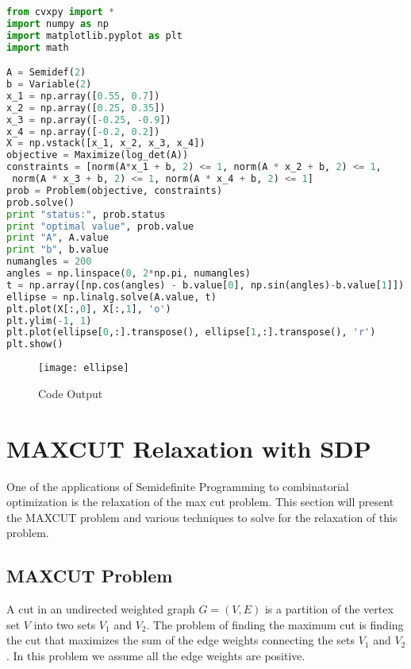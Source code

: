 \documentclass{article}
\begin{document}
\clearpage
\begin{lstlisting}[language=Python, caption=Solving Minimum Volume Ellipsoid Covering A Finite Set with CVXPY in Python]
from cvxpy import *
import numpy as np
import matplotlib.pyplot as plt
import math

A = Semidef(2)
b = Variable(2)
x_1 = np.array([0.55, 0.7])
x_2 = np.array([0.25, 0.35])
x_3 = np.array([-0.25, -0.9])
x_4 = np.array([-0.2, 0.2])
X = np.vstack([x_1, x_2, x_3, x_4])
objective = Maximize(log_det(A))
constraints = [norm(A*x_1 + b, 2) <= 1, norm(A * x_2 + b, 2) <= 1,
 norm(A * x_3 + b, 2) <= 1, norm(A * x_4 + b, 2) <= 1]
prob = Problem(objective, constraints)
prob.solve()
print "status:", prob.status
print "optimal value", prob.value
print "A", A.value
print "b", b.value
numangles = 200
angles = np.linspace(0, 2*np.pi, numangles)
t = np.array([np.cos(angles) - b.value[0], np.sin(angles)-b.value[1]]).reshape(2,200)
ellipse = np.linalg.solve(A.value, t)
plt.plot(X[:,0], X[:,1], 'o')
plt.ylim(-1, 1)
plt.plot(ellipse[0,:].transpose(), ellipse[1,:].transpose(), 'r')
plt.show()
\end{lstlisting}
\begin{figure}[h]
\caption{Code Output}
\texttt{[image: ellipse]}
\centering
\end{figure}
\clearpage

\section{MAXCUT Relaxation with SDP}
One of the applications of Semidefinite Programming to combinatorial optimization is the relaxation of the max cut problem. This section will present the MAXCUT problem and various techniques to solve for the relaxation of this problem.
\subsection{MAXCUT Problem}
A cut in an undirected weighted graph $G = (V,E)$ is a partition of the vertex set $V$ into two sets $V_1$ and $V_2$. The problem of finding the maximum cut is finding the cut that maximizes the sum of the edge weights connecting the sets $V_1$ and $V_2$. In this problem we assume all the edge weights are positive. 
\end{document}
